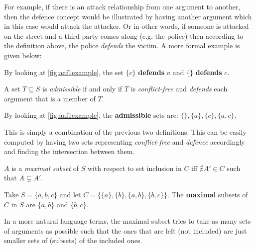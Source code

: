             For example, if there is an attack relationship from one argument to another, then the defence concept would be illustrated by having another argument which in this case would attack the attacker. Or in other words, if someone is attacked on the street and a third party comes along (e.g. the police) then according to the definition above, the police \textit{defends} the victim. A more formal example is given below:
            
            \begin{exa}
                By looking at \autoref{fig:aaf1example}, the set $\{c\}$ \textbf{defends} $a$ and $\{\}$ \textbf{defends} $c$.
                \label{exa:example3}
            \end{exa}
            
            \begin{definition}
                A set $T \subseteq S$ is \textit{admissible} if and only if $T$ is \textit{conflict-free} and \textit{defends} each argument that is a member of $T$.
                \label{definition:definition4}
            \end{definition}
            
            \begin{exa}
                By looking at \autoref{fig:aaf1example}, the \textbf{admissible} sets are:  $\{\}, \{a\}, \{c\}, \{a, c\}$.
                \label{exa:example4}
            \end{exa}
            
            This is simply a combination of the previous two definitions. This can be easily computed by having two sets representing \textit{conflict-free} and \textit{defence} accordingly and finding the intersection between them.
            
            \begin{definition}
                $A$ is a \textit{maximal subset} of $S$ with respect to set inclusion in $C$ iff $\nexists A' \in C$ such that $A \subsetneq A'$.
                \label{definition:definition5}
            \end{definition}
            \begin{exa}
                Take $S = \{a, b, c\}$ and let $C = \{\{a\}, \{b\}, \{a, b\}, \{b, c\}\}$. The \textbf{maximal} subsets of $C$ in $S$ are $\{a, b\}$ and $\{b, c\}$.
                \label{exa:example5}
            \end{exa}
            
            In a more natural language terms, the maximal subset tries to take as many sets of arguments as possible such that the ones that are left (not included) are just smaller sets of (subsets) of the included ones.
            
